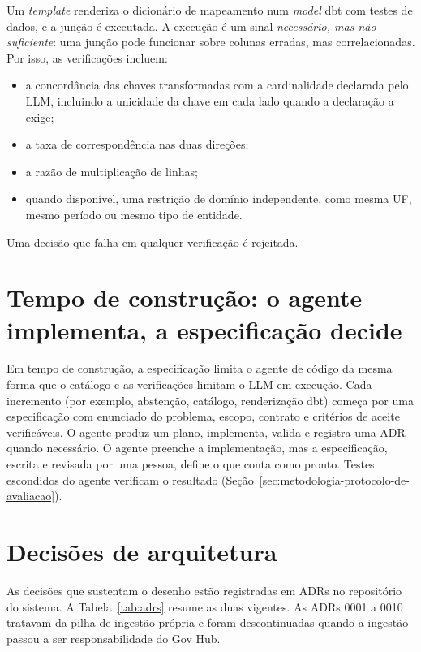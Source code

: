 Um \emph{template} renderiza o dicionário de mapeamento num \emph{model} dbt
com testes de dados, e a junção é executada. A execução é um sinal
\emph{necessário, mas não suficiente}: uma junção pode funcionar sobre colunas
erradas, mas correlacionadas. Por isso, as verificações incluem:

\begin{itemize}
\item a concordância das chaves transformadas com a cardinalidade declarada
pelo LLM, incluindo a unicidade da chave em cada lado quando a declaração a
exige;
\item a taxa de correspondência nas duas direções;
\item a razão de multiplicação de linhas;
\item quando disponível, uma restrição de domínio independente, como mesma UF,
mesmo período ou mesmo tipo de entidade.
\end{itemize}

Uma decisão que falha em qualquer verificação é rejeitada.

\section{Tempo de construção: o agente implementa, a especificação decide}
\label{sec:arquitetura-tempo-de-construcao}

Em tempo de construção, a especificação limita o agente de código da mesma
forma que o catálogo e as verificações limitam o LLM em execução. Cada
incremento (por exemplo, abstenção, catálogo, renderização dbt) começa por
uma especificação com enunciado do problema, escopo, contrato e critérios de
aceite verificáveis. O agente produz um plano, implementa, valida e registra
uma ADR quando necessário. O agente preenche a implementação, mas a
especificação, escrita e revisada por uma pessoa, define o que conta como
pronto. Testes escondidos do agente verificam o resultado
(Seção~\ref{sec:metodologia-protocolo-de-avaliacao}).

\section{Decisões de arquitetura}
\label{sec:arquitetura-decisoes-de-arquitetura}

As decisões que sustentam o desenho estão registradas em ADRs no repositório
do sistema. A Tabela~\ref{tab:adrs} resume as duas vigentes. As ADRs 0001 a
0010 tratavam da pilha de ingestão própria e foram descontinuadas quando a
ingestão passou a ser responsabilidade do Gov Hub.


